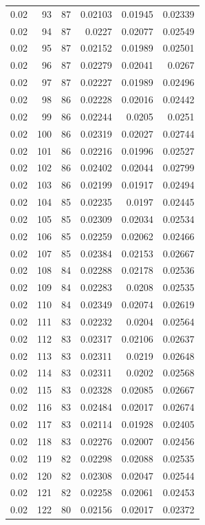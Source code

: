 \begin{tabular}{rrrrrr}
0.02 & 93 & 87 & 0.02103 & 0.01945 & 0.02339 \\
0.02 & 94 & 87 & 0.0227 & 0.02077 & 0.02549 \\
0.02 & 95 & 87 & 0.02152 & 0.01989 & 0.02501 \\
0.02 & 96 & 87 & 0.02279 & 0.02041 & 0.0267 \\
0.02 & 97 & 87 & 0.02227 & 0.01989 & 0.02496 \\
0.02 & 98 & 86 & 0.02228 & 0.02016 & 0.02442 \\
0.02 & 99 & 86 & 0.02244 & 0.0205 & 0.0251 \\
0.02 & 100 & 86 & 0.02319 & 0.02027 & 0.02744 \\
0.02 & 101 & 86 & 0.02216 & 0.01996 & 0.02527 \\
0.02 & 102 & 86 & 0.02402 & 0.02044 & 0.02799 \\
0.02 & 103 & 86 & 0.02199 & 0.01917 & 0.02494 \\
0.02 & 104 & 85 & 0.02235 & 0.0197 & 0.02445 \\
0.02 & 105 & 85 & 0.02309 & 0.02034 & 0.02534 \\
0.02 & 106 & 85 & 0.02259 & 0.02062 & 0.02466 \\
0.02 & 107 & 85 & 0.02384 & 0.02153 & 0.02667 \\
0.02 & 108 & 84 & 0.02288 & 0.02178 & 0.02536 \\
0.02 & 109 & 84 & 0.02283 & 0.0208 & 0.02535 \\
0.02 & 110 & 84 & 0.02349 & 0.02074 & 0.02619 \\
0.02 & 111 & 83 & 0.02232 & 0.0204 & 0.02564 \\
0.02 & 112 & 83 & 0.02317 & 0.02106 & 0.02637 \\
0.02 & 113 & 83 & 0.02311 & 0.0219 & 0.02648 \\
0.02 & 114 & 83 & 0.02311 & 0.0202 & 0.02568 \\
0.02 & 115 & 83 & 0.02328 & 0.02085 & 0.02667 \\
0.02 & 116 & 83 & 0.02484 & 0.02017 & 0.02674 \\
0.02 & 117 & 83 & 0.02114 & 0.01928 & 0.02405 \\
0.02 & 118 & 83 & 0.02276 & 0.02007 & 0.02456 \\
0.02 & 119 & 82 & 0.02298 & 0.02088 & 0.02535 \\
0.02 & 120 & 82 & 0.02308 & 0.02047 & 0.02544 \\
0.02 & 121 & 82 & 0.02258 & 0.02061 & 0.02453 \\
0.02 & 122 & 80 & 0.02156 & 0.02017 & 0.02372 \\

\end{tabular}
